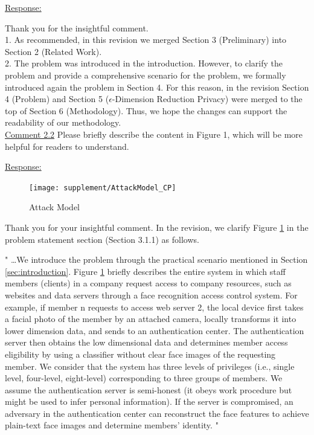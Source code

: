 \documentclass[]{elsarticle}
\begin{document}
\color{black}
\underline{Response:}

Thank you for the insightful comment. \\
1. As recommended, in this revision we merged Section 3 (Preliminary) into Section 2 (Related Work).\\ 
2. The problem was introduced in the introduction. However, to clarify the problem and provide a comprehensive scenario for the problem, we formally introduced again the problem in Section 4. For this reason, in the revision  Section 4 (Problem) and Section 5 ($\epsilon$-Dimension Reduction Privacy) were merged to the top of Section 6 (Methodology). Thus, we hope the changes can support the readability of our methodology. \\


\color{blue}
\underline{Comment 2.2}
Please briefly describe the content in Figure 1, which will be more helpful for readers to understand.


\color{black}
\underline{Response:}
\setcounter{figure}{0}
\begin{figure}[H]
	\centering
	\texttt{[image: supplement/AttackModel\_CP]}
	\captionsetup{justification=centering}
	\caption{Attack Model}
	\label{fig:attackmodel}
\end{figure} 	
Thank you for your insightful comment. In the revision, we clarify Figure \ref{fig:attackmodel} in the problem statement section (Section 3.1.1) as follows. 

	"
	\dots We introduce the problem through the practical scenario mentioned in Section \ref{sec:introduction}. Figure \ref{fig:attackmodel} briefly describes the entire system in which staff members (clients) in a company request access to company resources, such as websites and data servers through a face recognition access control system. For example, if member n requests to access web server 2, the local device first takes a facial photo of the member by an attached camera, locally transforms it into lower dimension data, and sends to an authentication center. The authentication server then obtains the low dimensional data and determines member access eligibility by using a classifier without clear face images of the requesting member. We consider that the system has three levels of privileges (i.e., single level, four-level, eight-level) corresponding to three groups of members. We assume the authentication server is semi-honest (it obeys work procedure but might be used to infer personal information). If the server is compromised, an adversary in the authentication center can reconstruct the face features to achieve plain-text face images and determine members' identity.  
"\\\\
  
\end{document}

